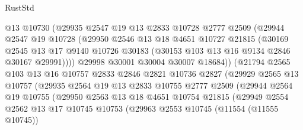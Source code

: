 \begin{lexlean}{RustStd}
\begin{coremodule}
                      @13
                      @10730
                      (@29935
                        @2547
                        @19
                        @13
                        @2833
                        @10728
                        @2777
                        @2509
                        (@29944
                          @2547
                          @19
                          @10728
                          (@29950
                            @2546
                            @13
                            @18
                            @4651
                            @10727
                            @21815
                            (@30169
                              @2545
                              @13
                              @17
                              @9140
                              @10726
                              @30183
                              (@30153 @103 @13 @16 @9134 @2846 @30167 @29991))))
                        @29998
                        @30001
                        @30004
                        @30007
                        @18684))
                    (@21794
                      @2565
                      @103
                      @13
                      @16
                      @10757
                      @2833
                      @2846
                      @2821
                      @10736
                      @2827
                      (@29929
                        @2565
                        @13
                        @10757
                        (@29935
                          @2564
                          @19
                          @13
                          @2833
                          @10755
                          @2777
                          @2509
                          (@29944
                            @2564
                            @19
                            @10755
                            (@29950
                              @2563
                              @13
                              @18
                              @4651
                              @10754
                              @21815
                              (@29949
                                @2554
                                @2562
                                @13
                                @17
                                @10745
                                @10753
                                (@29963
                                  @2553
                                  @10745
                                  (@11554 (@11555 @10745))

\end{coremodule}
\end{lexlean}
